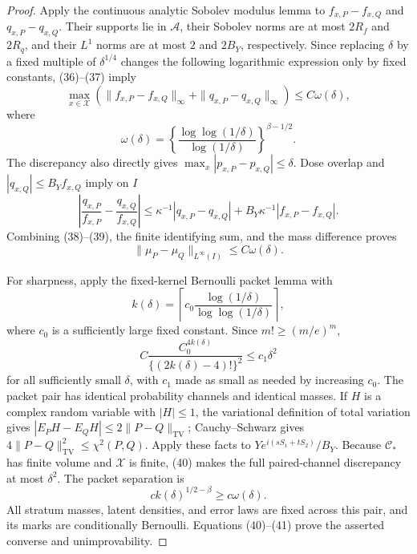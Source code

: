 \documentclass{article}
\begin{document}
\begin{proof}
Apply the continuous analytic Sobolev modulus lemma to \(f_{x,P}-f_{x,Q}\) and \(q_{x,P}-q_{x,Q}\).  Their supports lie in \(\mathcal A\), their Sobolev norms are at most \(2R_f\) and \(2R_q\), and their \(L^1\) norms are at most \(2\) and \(2B_Y\), respectively.  Since replacing \(\delta\) by a fixed multiple of \(\delta^{1/4}\) changes the following logarithmic expression only by fixed constants, (36)--(37) imply
\[
\max_{x\in\mathcal X}\left(
\|f_{x,P}-f_{x,Q}\|_\infty+
\|q_{x,P}-q_{x,Q}\|_\infty\right)
\le C\omega(\delta), \tag{38}
\]
where
\[
\omega(\delta)=
\left\{\frac{\log\log(1/\delta)}{\log(1/\delta)}\right\}^{\beta-1/2}.
\]
The discrepancy also directly gives \(\max_x|p_{x,P}-p_{x,Q}|\le\delta\).  Dose overlap and \(|q_{x,Q}|\le B_Yf_{x,Q}\) imply on \(I\)
\[
\left|\frac{q_{x,P}}{f_{x,P}}-
\frac{q_{x,Q}}{f_{x,Q}}\right|
\le \kappa^{-1}|q_{x,P}-q_{x,Q}|
+B_Y\kappa^{-1}|f_{x,P}-f_{x,Q}|. \tag{39}
\]
Combining (38)--(39), the finite identifying sum, and the mass difference proves
\[
\|\mu_P-\mu_Q\|_{L^\infty(I)}\le C\omega(\delta).
\]

For sharpness, apply the fixed-kernel Bernoulli packet lemma with
\[
k(\delta)=\left\lceil c_0
\frac{\log(1/\delta)}{\log\log(1/\delta)}\right\rceil,
\]
where \(c_0\) is a sufficiently large fixed constant.  Since \(m!\ge(m/e)^m\),
\[
C\frac{C_0^{4k(\delta)}}{\{(2k(\delta)-4)!\}^2}\le c_1\delta^2 \tag{40}
\]
for all sufficiently small \(\delta\), with \(c_1\) made as small as needed by increasing \(c_0\).  The packet pair has identical probability channels and identical masses.  If \(H\) is a complex random variable with \(|H|\le1\), the variational definition of total variation gives \(|E_PH-E_QH|\le2\|P-Q\|_{\mathrm{TV}}\); Cauchy--Schwarz gives \(4\|P-Q\|_{\mathrm{TV}}^2\le\chi^2(P,Q)\).  Apply these facts to \(Y e^{i(sS_1+tS_2)}/B_Y\).  Because \(\mathcal C_*\) has finite volume and \(\mathcal X\) is finite, (40) makes the full paired-channel discrepancy at most \(\delta^2\).  The packet separation is
\[
ck(\delta)^{1/2-\beta}\ge c\omega(\delta). \tag{41}
\]
All stratum masses, latent densities, and error laws are fixed across this pair, and its marks are conditionally Bernoulli.  Equations (40)--(41) prove the asserted converse and unimprovability.
\end{proof}
\end{document}
